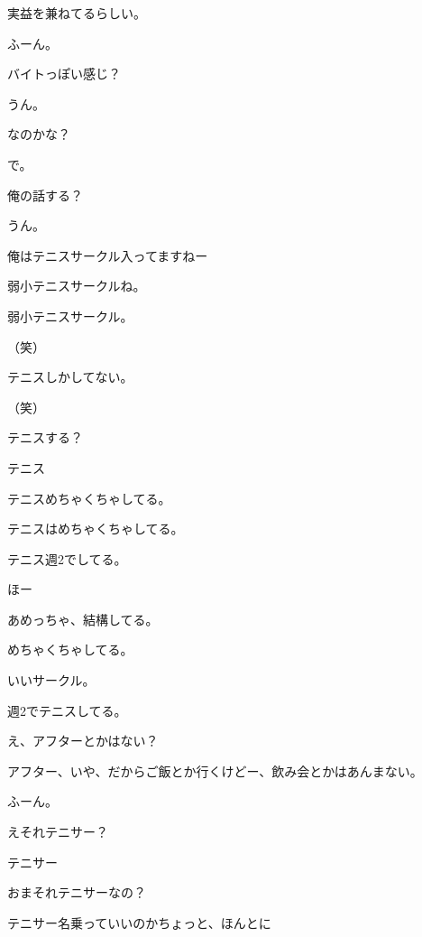 \begin{multicols}{3}
{        実益を兼ねてるらしい。

        ふーん。

        バイトっぽい感じ？

        うん。

        なのかな？

        で。

        俺の話する？

        うん。

        俺はテニスサークル入ってますねー

        弱小テニスサークルね。

        弱小テニスサークル。

        （笑）

        テニスしかしてない。

        （笑）

        テニスする？

        テニス

        テニスめちゃくちゃしてる。

        テニスはめちゃくちゃしてる。

        テニス週2でしてる。

        ほー

        あめっちゃ、結構してる。

        めちゃくちゃしてる。

        いいサークル。

        週2でテニスしてる。

        え、アフターとかはない？

        アフター、いや、だからご飯とか行くけどー、飲み会とかはあんまない。

        ふーん。

        えそれテニサー？

        テニサー

        おまそれテニサーなの？

        テニサー名乗っていいのかちょっと、ほんとに

}
\end{multicols}
